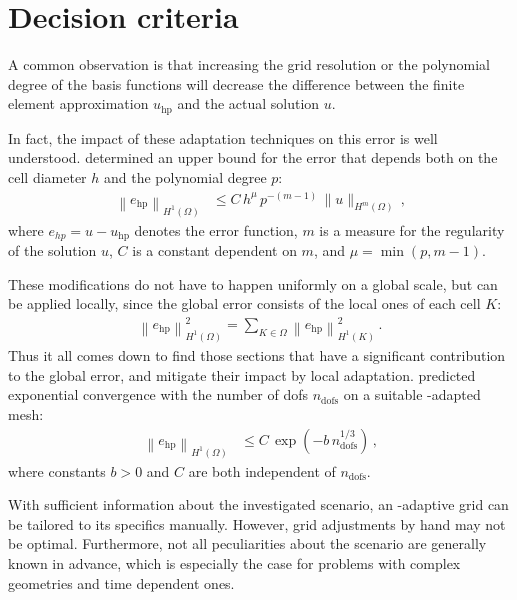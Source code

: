 \section{Decision criteria}
\label{sec:decision}

A common observation is that increasing the grid resolution or the polynomial degree of the basis functions will decrease the difference between the finite element approximation $u_\text{hp}$ and the actual solution $u$.

In fact, the impact of these adaptation techniques on this error is well understood. \textcite[Thm.~3.4]{babuska1990} determined an upper bound for the error that depends both on the cell diameter $h$ and the polynomial degree $p$:
\begin{align}
\label{eq:errorbound_hp} \left\|e_\text{hp}\right\|_{H^{1}(\Omega)} &\leq C \, h^{\mu} \, p^{-(m-1)} \, \|u\|_{H^{m}(\Omega)} \,\text{,}
\end{align}
where $e_{hp} = u - u_\text{hp}$ denotes the error function, $m$ is a measure for the regularity of the solution $u$, $C$ is a constant dependent on $m$, and $\mu = \min \left(p, m - 1\right)$.

These modifications do not have to happen uniformly on a global scale, but can be applied locally, since the global error consists of the local ones of each cell $K$:
\begin{align}
\label{eq:error_sum} \left\|e_\text{hp}\right\|_{H^1(\Omega)}^2 = \sum\limits_{K \in \Omega} \left\|e_\text{hp}\right\|_{H^1(K)}^2 \,\text{.}
\end{align}
Thus it all comes down to find those sections that have a significant contribution to the global error, and mitigate their impact by local adaptation. \textcite[Thm.~5.1]{guo1986} predicted exponential convergence with the number of \glspl{dof} $n_\text{dofs}$ on a suitable \hp-adapted mesh:
\begin{align}
\label{eq:errorbound_exp} \left\|e_\text{hp}\right\|_{H^{1}(\Omega)} &\leq C \, \exp\left(- b \, n_\text{dofs}^{1 / 3}\right) \,\text{,}
\end{align}
where constants $b > 0$ and $C$ are both independent of $n_\text{dofs}$.

With sufficient information about the investigated scenario, an \hp-adaptive grid can be tailored to its specifics manually. However, grid adjustments by hand may not be optimal. Furthermore, not all peculiarities about the scenario are generally known in advance, which is especially the case for problems with complex geometries and time dependent ones.

